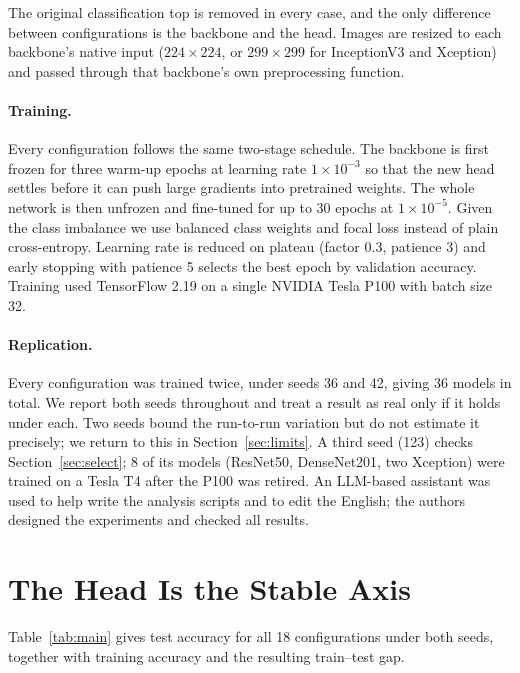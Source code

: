 \documentclass[runningheads]{llncs}
\begin{document}
The original classification top is removed in every case, and the only
difference between configurations is the backbone and the head. Images are
resized to each backbone's native input ($224\times224$, or $299\times299$ for
InceptionV3 and Xception) and passed through that backbone's own preprocessing
function.

\paragraph{Training.}
Every configuration follows the same two-stage schedule. The backbone is first
frozen for three warm-up epochs at learning rate $1\times10^{-3}$ so that the
new head settles before it can push large gradients into pretrained weights.
The whole network is then unfrozen and fine-tuned for up to 30 epochs at
$1\times10^{-5}$. Given the class imbalance we use balanced class weights and
focal loss instead of plain cross-entropy. Learning rate is reduced on plateau
(factor 0.3, patience 3) and early stopping with patience 5 selects the best
epoch by validation accuracy. Training used TensorFlow 2.19 on a single NVIDIA
Tesla P100 with batch size 32.

\paragraph{Replication.}
Every configuration was trained twice, under seeds 36 and 42, giving 36 models
in total. We report both seeds throughout and treat a result as real only if it
holds under each. Two seeds bound the run-to-run variation but do not estimate
it precisely; we return to this in Section~\ref{sec:limits}. A third seed (123)
checks Section~\ref{sec:select}; 8 of its models (ResNet50, DenseNet201, two
Xception) were trained on a Tesla T4 after the P100 was retired. An LLM-based
assistant was used to help write the analysis scripts and to edit the English;
the authors designed the experiments and checked all results.

\section{The Head Is the Stable Axis}

Table~\ref{tab:main} gives test accuracy for all 18 configurations under both
seeds, together with training accuracy and the resulting train--test gap.
\end{document}
